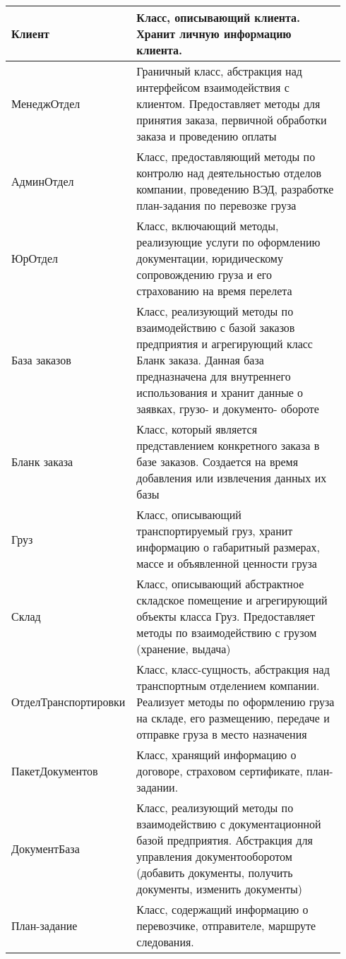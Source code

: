 \documentclass[a4paper,14pt]{extarticle}
\begin{document}
\begin{longtable}{|m{0.3\linewidth}|m{0.64\linewidth}|}
	Клиент & Класс, описывающий клиента. Хранит личную информацию клиента. \\ \hline
	МенеджОтдел & Граничный класс, абстракция над интерфейсом взаимодействия с клиентом. Предоставляет методы для принятия заказа, первичной обработки заказа и проведению оплаты \\ \hline
	АдминОтдел & Класс, предоставляющий методы по контролю над деятельностью отделов компании, проведению ВЭД, разработке план-задания по перевозке груза \\ \hline
	ЮрОтдел & Класс, включающий методы, реализующие услуги по оформлению документации, юридическому сопровождению груза и его страхованию на время перелета \\ \hline
	База заказов & Класс, реализующий методы по взаимодействию с базой заказов предприятия и агрегирующий класс Бланк заказа. Данная база предназначена для внутреннего использования и хранит данные о заявках, грузо- и документо- обороте \\ \hline
	Бланк заказа & Класс, который является представлением конкретного заказа в базе заказов. Создается на время добавления или извлечения данных их базы \\ \hline
	Груз & Класс, описывающий транспортируемый груз, хранит информацию о габаритный размерах, массе и объявленной ценности груза \\\hline
	Склад & Класс, описывающий абстрактное складское помещение и агрегирующий объекты класса Груз. Предоставляет методы по взаимодействию с грузом (хранение, выдача) \\\hline
	ОтделТранспортировки & Класс, класс-сущность, абстракция над транспортным отделением компании. Реализует методы по оформлению груза на складе, его размещению, передаче и отправке груза в место назначения \\ \hline
	ПакетДокументов& Класс, хранящий информацию о договоре, страховом сертификате, план-задании. \\ \hline
	ДокументБаза & Класс, реализующий методы по взаимодействию с документационной базой предприятия. Абстракция для управления документооборотом (добавить документы, получить документы, изменить документы) \\ \hline
	План-задание & Класс, содержащий информацию о перевозчике, отправителе, маршруте следования.\\ \hline
\end{longtable}
\vspace{4ex}
\normalsize
\end{document}
